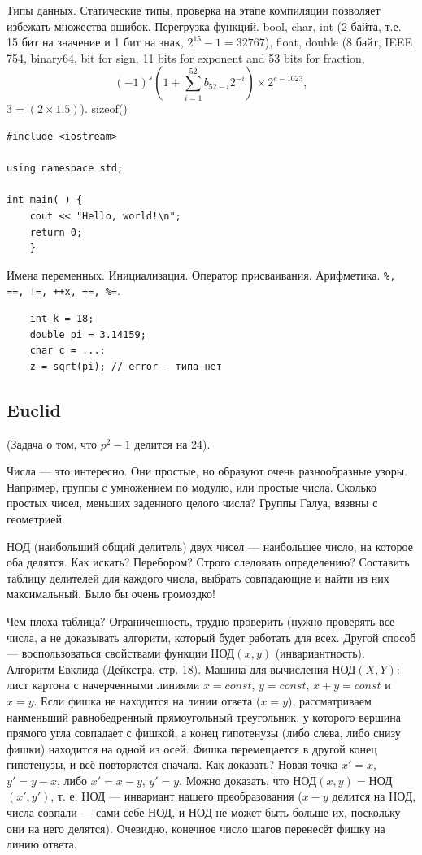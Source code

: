 \documentclass{book}
\begin{document}
Типы данных. Статические типы, проверка на этапе компиляции позволяет избежать множества ошибок.
Перегрузка функций.
bool, char, int (2 байта, т.е. 15 бит на значение и 1 бит на знак, $2^{15} - 1 = 32767$),
float, double (8 байт, IEEE 754, binary64, bit for sign, 11 bits for exponent and 53 bits for
fraction,
\begin{equation}
    (-1)^s \left(1 + \sum_{i = 1}^{52} b_{52 - i} 2^{-i} \right) \times 2^{e - 1023},
\end{equation}
 $3 = (2 \times 1.5)$). sizeof()

\begin{verbatim}
#include <iostream> 

using namespace std;

int main( ) { 
    cout << "Hello, world!\n"; 
    return 0; 
    }
\end{verbatim}

Имена переменных. Инициализация. Оператор присваивания. Арифметика.
\texttt{\%, ==, !=, ++x, +=, \%=}.
\begin{verbatim}
    int k = 18;
    double pi = 3.14159;
    char c = ...;
    z = sqrt(pi); // error - типа нет
\end{verbatim}

\subsection{Euclid}

(Задача о том, что $p^2 - 1$ делится на 24).

Числа  --- это интересно. Они простые, но образуют очень разнообразные узоры. Например, группы с
умножением по модулю, или простые числа. Сколько простых чисел, меньших заденного целого числа?
Группы Галуа, вязвны с геометрией.

НОД (наибольший общий делитель) двух чисел --- наибольшее число, на которое оба делятся. Как
искать? Перебором?
Строго следовать определению? Составить
таблицу делителей для каждого числа, выбрать совпадающие и найти из них максимальный. Было бы очень
громоздко!

Чем плоха
таблица? Ограниченность, трудно проверить (нужно проверять все числа, а не доказывать алгоритм,
который будет работать для всех. Другой способ --- воспользоваться свойствами функции НОД$(x, y)$ (инвариантность).
Алгоритм
Евклида (Дейкстра, стр. 18). Машина для вычисления НОД$(X, Y)$: лист картона с начерченными линиями
$x = const$, $y = const$, $x + y =
const$ и $x = y$. Если фишка не находится на линии ответа ($x = y$), рассматриваем наименьший
равнобедренный прямоугольный треугольник, у которого вершина прямого угла совпадает с фишкой, а
конец гипотенузы (либо слева, либо снизу фишки) находится на одной из осей. Фишка перемещается в
другой конец гипотенузы, и всё повторяется сначала. Как доказать? Новая точка $x' = x$, $y' = y -
x$, либо $x' = x - y$, $y' = y$. Можно доказать, что НОД$(x, y) = $НОД$(x', y')$, т. е. НОД ---
инвариант нашего преобразования ($x - y$ делится на НОД, числа совпали --- сами себе НОД, и НОД не
может быть больше их, поскольку они на него делятся). Очевидно, конечное число шагов перенесёт
фишку на линию ответа.
\end{document}
